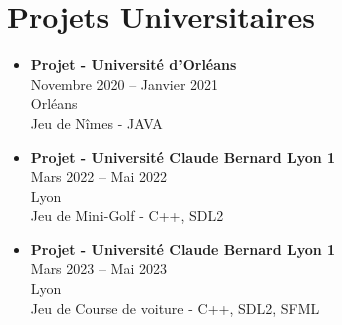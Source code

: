 \documentclass{article}
\begin{document}
\section*{Projets Universitaires}
\begin{itemize}[label=--]
    \item \textbf{Projet - Université d’Orléans}\\
    Novembre 2020 – Janvier 2021 \\
    Orléans \\
    Jeu de Nîmes - JAVA
    
    \item \textbf{Projet - Université Claude Bernard Lyon 1}\\
    Mars 2022 – Mai 2022 \\
    Lyon \\
    Jeu de Mini-Golf - C++, SDL2
    
    \item \textbf{Projet - Université Claude Bernard Lyon 1}\\
    Mars 2023 – Mai 2023 \\
    Lyon \\
    Jeu de Course de voiture - C++, SDL2, SFML
\end{itemize}
\end{document}
